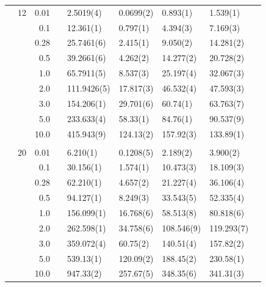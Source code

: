 \begin{table}[H]
\begin{tabularx}{\textwidth}{R{1cm}rrcR{2.3cm}R{2.3cm}R{2.3cm}R{2.3cm}R{1cm}}
		&12 & 0.01 && 2.5019(4) & 0.0699(2) & 0.893(1) & 1.539(1) \\
		&& 0.1 && 12.361(1) & 0.797(1) & 4.394(3) & 7.169(3) \\
		&& 0.28 && 25.7461(6) & 2.415(1) & 9.050(2) & 14.281(2) \\
		&& 0.5 && 39.2661(6) & 4.262(2) & 14.277(2) & 20.728(2) \\
		&& 1.0 && 65.7911(5) & 8.537(3) & 25.197(4) & 32.067(3) \\
		&& 2.0 && 111.9426(5) & 17.817(3) & 46.532(4) & 47.593(3) \\
		&& 3.0 && 154.206(1) & 29.701(6) & 60.74(1) & 63.763(7) \\ 
		&& 5.0 && 233.633(4) & 58.33(1) & 84.76(1) & 90.537(9) \\
		&& 10.0 && 415.943(9) & 124.13(2) & 157.92(3) & 133.89(1) \\
		\hline \\
		
		&20 & 0.01 && 6.210(1) & 0.1208(5) & 2.189(2) & 3.900(2) \\
		&& 0.1 && 30.156(1) & 1.574(1) & 10.473(3) & 18.109(3) \\
		&& 0.28 && 62.210(1) & 4.657(2) & 21.227(4) & 36.106(4) \\
		&& 0.5 && 94.127(1) & 8.249(3) & 33.543(5) & 52.335(4) \\
		&& 1.0 && 156.099(1) & 16.768(6) & 58.513(8) & 80.818(6) \\
		&& 2.0 && 262.598(1) & 34.758(6) & 108.546(9) & 119.293(7) \\
		&& 3.0 && 359.072(4) & 60.75(2) & 140.51(4) & 157.82(2) \\ 
		&& 5.0 && 539.13(1) & 120.09(2) & 188.45(2) & 230.58(1) \\
		&& 10.0 && 947.33(2) & 257.67(5) & 348.35(6) & 341.31(3) \\
		\hline \hline
	\end{tabularx}
\end{table} 
